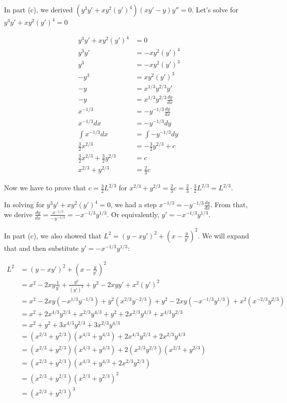 \documentclass[9pt]{article}
\begin{document}
In part (c), we derived $(y^3y' + xy^2(y')^4)(xy' - y)y'' = 0$. Let's solve for $y^3y' + xy^2(y')^4 = 0$

\begin{align*}
  y^3y' + xy^2(y')^4 &= 0\\
  y^3y' &= -xy^2(y')^4\\
  y^3 &= -xy^2(y')^3\\
  -y^3 &= xy^2(y')^3\\
  -y &= x^{1/3}y^{2/3}y'\\
  -y &= x^{1/3}y^{2/3}\frac{dy}{dx}\\
  x^{-1/3} &= -y^{-1/3}\frac{dy}{dx}\\
  x^{-1/3} dx &= -y^{-1/3} dy\\
  \int x^{-1/3} dx &= \int -y^{-1/3} dy\\
  \frac{3}{2} x^{2/3} &= -\frac{3}{2} y^{2/3} + c\\
  \frac{3}{2} x^{2/3} + \frac{3}{2} y^{2/3} &= c\\
  x^{2/3} + y^{2/3} &= \frac{2}{3}c
\end{align*}

Now we have to prove that $c = \frac{3}{2}L^{2/3}$ for $x^{2/3} + y^{2/3} = \frac{2}{3}c = \frac{2}{3} \cdot \frac{3}{2}L^{2/3} = L^{2/3}$.

In solving for $y^3y' + xy^2(y')^4 = 0$, we had a step $x^{-1/3} = -y^{-1/3}\frac{dy}{dx}$. From that, we derive $\frac{dy}{dx} = \frac{x^{-1/3}}{-y^{-1/3}} = -x^{-1/3}y^{1/3}$. Or equivalently, $y' = -x^{-1/3}y^{1/3}$.

In part (c), we also showed that $L^2 = (y - xy')^2 + (x - \frac{y}{y'})^2$. We will expand that and then substitute $y' = -x^{-1/3}y^{1/3}$:

\begin{align*}
  L^2 &= (y - xy')^2 + (x - \frac{y}{y'})^2\\
      &= x^2 - 2xy\frac{1}{y'} + \frac{y^2}{(y')^2} + y^2 - 2xyy' + x^2(y')^2\\
      &= x^2 - 2xy(-x^{1/3}y^{-1/3}) + y^2(x^{2/3}y^{-2/3}) + y^2 - 2xy(-x^{-1/3}y^{1/3}) + x^2(x^{-2/3}y^{2/3})\\
      &= x^2 + 2x^{4/3}y^{2/3} + x^{2/3}y^{4/3} + y^2 + 2x^{2/3}y^{4/3} + x^{4/3}y^{2/3}\\
      &= x^2 + y^2 + 3x^{4/3}y^{2/3} + 3x^{2/3}y^{4/3}\\
      &= (x^{2/3} + y^{2/3})(x^{4/3} + y^{4/3}) + 2x^{4/3}y^{2/3} + 2x^{2/3}y^{4/3}\\
      &= (x^{2/3} + y^{2/3})(x^{4/3} + y^{4/3}) + 2(x^{2/3}y^{2/3})(x^{2/3} + y^{2/3})\\
      &= (x^{2/3} + y^{2/3})(x^{4/3} + y^{4/3} + 2x^{2/3}y^{2/3})\\
      &= (x^{2/3} + y^{2/3})(x^{2/3} + y^{2/3})^2\\
      &= (x^{2/3} + y^{2/3})^3
\end{align*}
\end{document}
